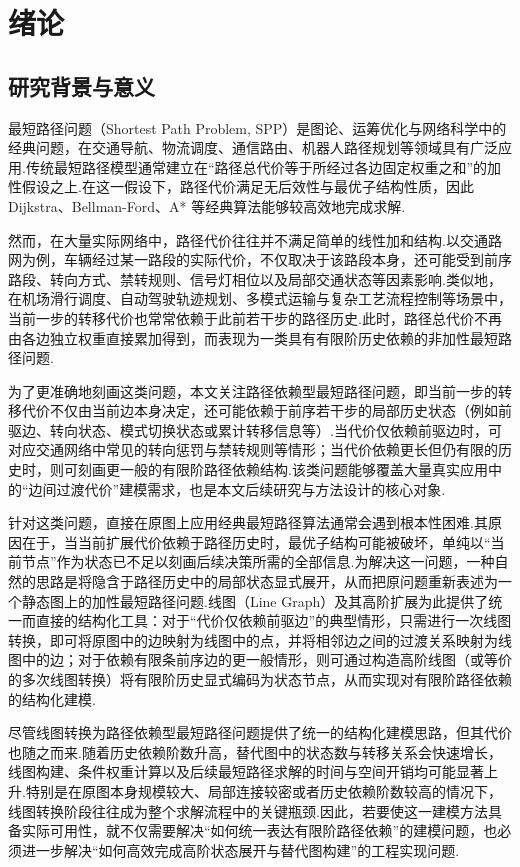 
\chapter{绪论}

\section{研究背景与意义}

最短路径问题（Shortest Path Problem, SPP）是图论、运筹优化与网络科学中的经典问题，在交通导航、物流调度、通信路由、机器人路径规划等领域具有广泛应用.传统最短路径模型通常建立在“路径总代价等于所经过各边固定权重之和”的加性假设之上.在这一假设下，路径代价满足无后效性与最优子结构性质，因此 Dijkstra、Bellman-Ford、A* 等经典算法能够较高效地完成求解\cite{dijkstra1959note}.

然而，在大量实际网络中，路径代价往往并不满足简单的线性加和结构.以交通路网为例，车辆经过某一路段的实际代价，不仅取决于该路段本身，还可能受到前序路段、转向方式、禁转规则、信号灯相位以及局部交通状态等因素影响.类似地，在机场滑行调度、自动驾驶轨迹规划、多模式运输与复杂工艺流程控制等场景中，当前一步的转移代价也常常依赖于此前若干步的路径历史.此时，路径总代价不再由各边独立权重直接累加得到，而表现为一类具有有限阶历史依赖的非加性最短路径问题.

为了更准确地刻画这类问题，本文关注路径依赖型最短路径问题，即当前一步的转移代价不仅由当前边本身决定，还可能依赖于前序若干步的局部历史状态（例如前驱边、转向状态、模式切换状态或累计转移信息等）.当代价仅依赖前驱边时，可对应交通网络中常见的转向惩罚与禁转规则等情形；当代价依赖更长但仍有限的历史时，则可刻画更一般的有限阶路径依赖结构.该类问题能够覆盖大量真实应用中的“边间过渡代价”建模需求，也是本文后续研究与方法设计的核心对象.

针对这类问题，直接在原图上应用经典最短路径算法通常会遇到根本性困难.其原因在于，当当前扩展代价依赖于路径历史时，最优子结构可能被破坏，单纯以“当前节点”作为状态已不足以刻画后续决策所需的全部信息.为解决这一问题，一种自然的思路是将隐含于路径历史中的局部状态显式展开，从而把原问题重新表述为一个静态图上的加性最短路径问题.线图（Line Graph）及其高阶扩展为此提供了统一而直接的结构化工具\cite{whitney1932congruent,harary1960some}：对于“代价仅依赖前驱边”的典型情形，只需进行一次线图转换，即可将原图中的边映射为线图中的点，并将相邻边之间的过渡关系映射为线图中的边；对于依赖有限条前序边的更一般情形，则可通过构造高阶线图（或等价的多次线图转换）将有限阶历史显式编码为状态节点，从而实现对有限阶路径依赖的结构化建模.

尽管线图转换为路径依赖型最短路径问题提供了统一的结构化建模思路，但其代价也随之而来.随着历史依赖阶数升高，替代图中的状态数与转移关系会快速增长，线图构建、条件权重计算以及后续最短路径求解的时间与空间开销均可能显著上升.特别是在原图本身规模较大、局部连接较密或者历史依赖阶数较高的情况下，线图转换阶段往往成为整个求解流程中的关键瓶颈.因此，若要使这一建模方法具备实际可用性，就不仅需要解决“如何统一表达有限阶路径依赖”的建模问题，也必须进一步解决“如何高效完成高阶状态展开与替代图构建”的工程实现问题.

